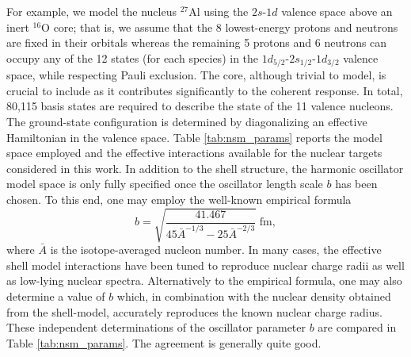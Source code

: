 \documentclass{book}[letterpaper,12pt]
\begin{document}
For example, we model the nucleus $^{27}$Al using the $2s$-$1d$ valence space above an inert $^{16}$O core; that is, we assume that the 8 lowest-energy protons and neutrons are fixed in their orbitals whereas the remaining 5 protons and 6 neutrons can occupy any of the 12 states (for each species) in the $1d_{5/2}$-$2s_{1/2}$-$1d_{3/2}$ valence space, while respecting Pauli exclusion. The core, although trivial to model, is crucial to include as it contributes significantly to the coherent response. In total, 80,115 basis states are required to describe the state of the 11 valence nucleons. The ground-state configuration is determined by diagonalizing an effective Hamiltonian in the valence space. Table \ref{tab:nsm_params} reports the model space employed and the effective interactions available for the nuclear targets considered in this work. In addition to the shell structure, the harmonic oscillator model space is only fully specified once the oscillator length scale $b$ has been chosen. To this end, one may employ the well-known empirical formula
\begin{equation}
b=\sqrt{\frac{41.467}{45\bar{A}^{-1/3}-25\bar{A}^{-2/3}}}\;\mathrm{fm},
\label{eq:b_empirical}
\end{equation}
where $\bar{A}$ is the isotope-averaged nucleon number. In many cases, the effective shell model interactions have been tuned to reproduce nuclear charge radii as well as low-lying nuclear spectra. Alternatively to the empirical formula, one may also determine a value of $b$ which, in combination with the nuclear density obtained from the shell-model, accurately reproduces the known nuclear charge radius. These independent determinations of the oscillator parameter $b$ are compared in Table \ref{tab:nsm_params}. The agreement is generally quite good.
\end{document}
